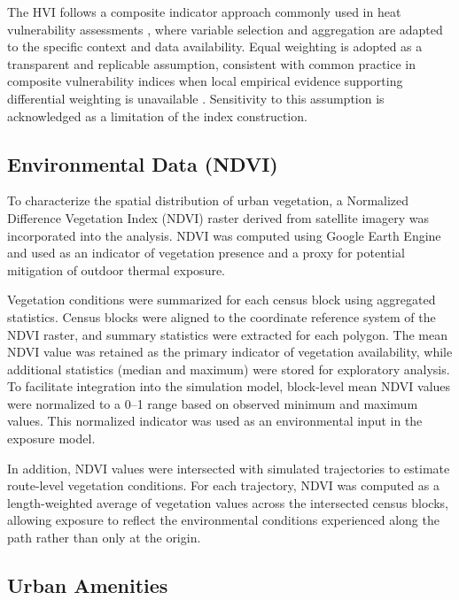 \documentclass{wscpaperproc}
\theoremstyle{wsc}
\begin{document}
The  HVI follows a composite indicator approach commonly used in heat vulnerability assessments \cite{sharma2025heat}, where variable selection and aggregation are adapted to the specific context and data availability. 
Equal weighting is adopted as a transparent and replicable assumption, consistent with common practice in composite vulnerability indices when local empirical evidence supporting differential weighting is unavailable \cite{sharma2025heat}. Sensitivity to this assumption is acknowledged as a limitation of the index construction.

\subsection{Environmental Data (NDVI)}

To characterize the spatial distribution of urban vegetation, a Normalized Difference Vegetation Index (NDVI) raster derived from satellite imagery was incorporated into the analysis. NDVI was computed using Google Earth Engine and used as an indicator of vegetation presence and a proxy for potential mitigation of outdoor thermal exposure.

Vegetation conditions were summarized for each census block using aggregated statistics. Census blocks were aligned to the coordinate reference system of the NDVI raster, and summary statistics were extracted for each polygon. The mean NDVI value was retained as the primary indicator of vegetation availability, while additional statistics (median and maximum) were stored for exploratory analysis.
To facilitate integration into the simulation model, block-level mean NDVI values were normalized to a 0--1 range based on observed minimum and maximum values. This normalized indicator was used as an environmental input in the exposure model.

In addition, NDVI values were intersected with simulated trajectories to estimate route-level vegetation conditions. For each trajectory, NDVI was computed as a length-weighted average of vegetation values across the intersected census blocks, allowing exposure to reflect the environmental conditions experienced along the path rather than only at the origin.

\subsection{Urban Amenities}
\end{document}
